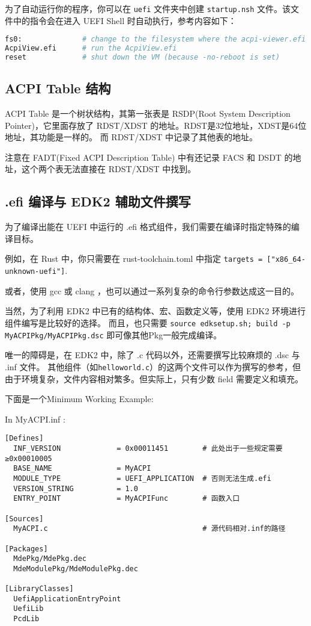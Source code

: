 为了自动运行你的程序，你可以在 \texttt{uefi} 文件夹中创建 \texttt{startup.nsh} 文件。该文件中的指令会在进入 UEFI Shell 时自动执行，参考内容如下：

\begin{lstlisting}[language=bash]
fs0:              # change to the filesystem where the acpi-viewer.efi is located
AcpiView.efi      # run the AcpiView.efi
reset             # shut down the VM (because -no-reboot is set)
\end{lstlisting}

\subsection{ACPI Table 结构}

ACPI Table 是一个树状结构，其第一张表是 RSDP(Root System Description Pointer)，它里面存放了 RDST/XDST 的地址。RDST是32位地址，XDST是64位地址，其功能是一样的。
而 RDST/XDST 中记录了其他表的地址。

注意在 FADT(Fixed ACPI Description Table) 中有还记录 FACS 和 DSDT 的地址，这个两个表无法直接在 RDST/XDST 中找到。

\subsection{.efi 编译与 EDK2 辅助文件撰写}
为了编译出能在 UEFI 中运行的 .efi 格式组件，我们需要在编译时指定特殊的编译目标。

例如，在 Rust 中，你只需要在 rust-toolchain.toml 中指定
\texttt{targets = ["x86\_64-unknown-uefi"]}.

或者，使用 gcc 或 clang ，也可以通过一系列复杂的命令行参数达成这一目的。

当然，为了利用 EDK2 中已有的结构体、宏、函数定义等，使用 EDK2 环境进行组件编写是比较好的选择。
而且，也只需要 \texttt{source edksetup.sh; build -p MyACPIPkg/MyACPIPkg.dsc} 即可像其他Pkg一般完成编译。

唯一的障碍是，在 EDK2 中，除了 .c 代码以外，还需要撰写比较麻烦的 .dsc 与 .inf 文件。
其他组件（如\texttt{helloworld.c}）的这两个文件可以作为撰写的参考，但由于环境复杂，文件内容相对繁多。但实际上，只有少数 field 需要定义和填充。

下面是一个Minimum Working Example:

In MyACPI.inf :

\begin{lstlisting}
[Defines]
  INF_VERSION             = 0x00011451        # 此处出于一些规定需要≥0x00010005
  BASE_NAME               = MyACPI
  MODULE_TYPE             = UEFI_APPLICATION  # 否则无法生成.efi
  VERSION_STRING          = 1.0
  ENTRY_POINT             = MyACPIFunc        # 函数入口

[Sources]
  MyACPI.c                                    # 源代码相对.inf的路径

[Packages]
  MdePkg/MdePkg.dec
  MdeModulePkg/MdeModulePkg.dec

[LibraryClasses]
  UefiApplicationEntryPoint
  UefiLib
  PcdLib
\end{lstlisting}

